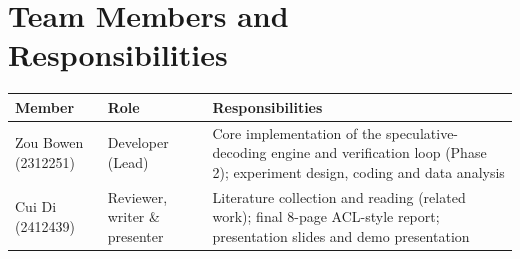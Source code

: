 \documentclass[11pt]{article}
\begin{document}
\section{Team Members and Responsibilities}
\begin{table}[h]
\centering
\small
\begin{tabular}{llp{6.2cm}}
\toprule
\textbf{Member} & \textbf{Role} & \textbf{Responsibilities} \\
\midrule
Zou Bowen (2312251) & Developer (Lead) & Core implementation of the
speculative-decoding engine and verification loop (Phase 2); experiment design,
coding and data analysis \\
Cui Di (2412439) & Reviewer, writer \& presenter & Literature collection and
reading (related work); final 8-page ACL-style report; presentation slides and
demo presentation \\
\bottomrule
\end{tabular}
\end{table}


\end{document}
